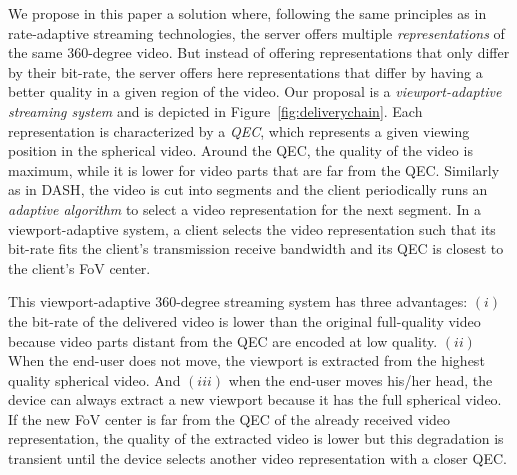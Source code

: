 We propose in this paper a solution where, following the same
principles as in rate-adaptive streaming technologies, the server
offers multiple \emph{representations} of the same 360-degree video.
But instead of offering representations that only differ by their
bit-rate, the server offers here representations that differ by having
a better quality in a given region of the video. Our proposal is a
\emph{viewport-adaptive streaming system} and is depicted in
Figure~\ref{fig:deliverychain}. Each representation is characterized
by a \emph{\ac{QEC}}, which represents a given viewing position in the
spherical video. Around the \ac{QEC}, the quality of the video is
maximum, while it is lower for video parts that are far from the
\ac{QEC}. Similarly as in \ac{DASH}, the video is cut into segments
and the client periodically runs an \emph{adaptive algorithm} to
select a video representation for the next segment. In a
viewport-adaptive system, a client selects the video representation
such that its bit-rate fits the client's transmission receive
bandwidth and its \ac{QEC} is closest to the client's \ac{FoV} center.



This viewport-adaptive 360-degree streaming system has three
advantages: $(i)$ the bit-rate of the delivered video is lower than
the original full-quality video because video parts distant from the
\ac{QEC} are encoded at low quality. $(ii)$ When the end-user does not
move, the viewport is extracted from the highest quality spherical
video. And $(iii)$ when the end-user moves his/her head, the device
can always extract a new viewport because it has the full spherical
video. If the new \ac{FoV} center is far from the \ac{QEC} of the
already received video representation, the quality of the extracted
video is lower but this degradation is transient until the device
selects another video representation with a closer \ac{QEC}.


